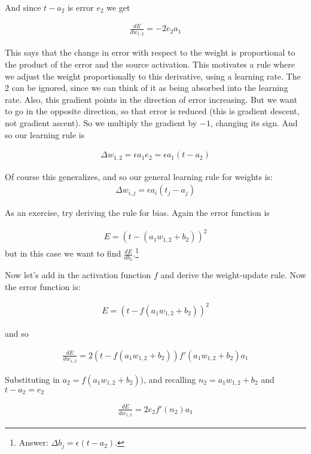 And since $t -  a_2$ is error $e_2$ we get

\begin{eqnarray*}
\frac{dE}{dw_{1,2}} = -2 e_2 a_1
\end{eqnarray*}

This says that the change in error with respect to the weight is proportional to the product of the error and the source activation. This motivates a rule where we adjust the weight proportionally to this derivative, using a learning rate. The 2 can be ignored, since we can think of it as being absorbed into the learning rate. Also, this gradient points in the direction of error increasing. But we want to go in the opposite direction, so that error is reduced (this is gradient descent, not gradient ascent). So we multiply the gradient by $-1$, changing its sign. And so our learning rule is 

\begin{eqnarray*}
\Delta w_{1,2}  =  \epsilon a_1 e_2  = \epsilon a_1 (t - a_2)
\end{eqnarray*} 

Of course this generalizes, and so our general learning rule for weights is:
\begin{eqnarray*}
\Delta w_{i,j}  =  \epsilon a_i (t_j - a_j)
\end{eqnarray*} 

As an exercise, try deriving the rule for bias. Again the error function is

\begin{eqnarray*}
E =  (t - ( a_1 w_{1,2} + b_2))^2 
\end{eqnarray*}
but in this case we want to find $\frac{dE}{db_{2}}$.\footnote{Answer: $\Delta b_j =  \epsilon (t - a_2)$.}

Now let's add in the activation function $f$ and derive the weight-update rule. Now the error function is:

\begin{eqnarray*}
E =  (t - f(a_1w_{1,2} + b_2))^2   
\end{eqnarray*}

and so

\begin{eqnarray*}
\frac{dE}{dw_{1,2}} = 2 (t - f(a_1w_{1,2} + b_2)) f'(a_1w_{1,2} + b_2) a_1 
\end{eqnarray*}

Substituting in $a_2 = f(a_1w_{1,2} + b_2))$, and recalling $n_2 = a_1w_{1,2} + b_2$  and $t - a_2 = e_2$ 

\begin{eqnarray*}
\frac{dE}{dw_{1,2}}  = 2 e_2 f'(n_2) a_1 
\end{eqnarray*}

